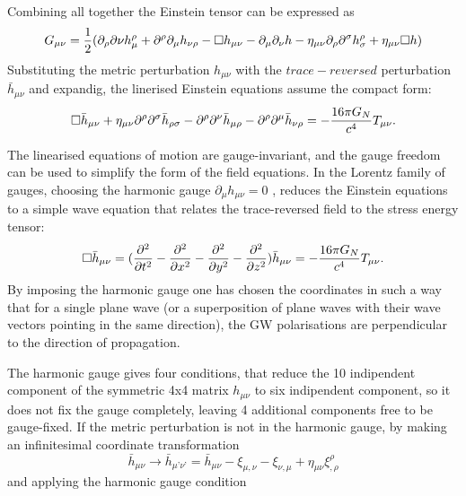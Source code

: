 \documentclass[binding=0.6cm, LaM]{sapthesis}
\begin{document}
Combining all together the Einstein tensor can be expressed as
\begin{equation}
G_{\mu\nu} = {1 \over 2}(\partial_{\rho}\partial{\nu}h^{\rho}_{\mu} + \partial^{\rho}\partial_{\mu}h_{\nu\rho} - \square h_{\mu\nu} - \partial_{\mu}\partial_{\nu}h - \eta_{\mu\nu}\partial_{\rho}\partial^{\sigma}h^{\rho}_{\sigma} + \eta_{\mu\nu}\square h)
\end{equation}
Substituting the metric perturbation $h_{\mu\nu}$  with the $trace-reversed$ perturbation ${\bar h}_{\mu\nu}$ and expandig, the linerised Einstein equations assume the  compact form:
\begin{equation}
\square {\bar h}_{\mu\nu} + \eta_{\mu\nu}{\partial}^{\rho}{\partial}^{\sigma}{\bar h}_{\rho\sigma} - {\partial}^{\rho}{\partial}^{\nu}{\bar h}_{\mu\rho} - {\partial}^{\rho}{\partial}^{\mu}{\bar h}_{\nu\rho} = - {{16\pi G_{N}} \over {c^4}}T_{\mu\nu}.
\end{equation}


The linearised equations of motion are gauge-invariant, and the gauge freedom can
 be used to simplify the form of the field equations.
 In the Lorentz family of gauges, choosing the harmonic gauge 
 $ \partial_{\mu}h_{\mu\nu} = 0 $ 
 , reduces the Einstein equations to a simple wave equation that relates the trace-reversed field
 to the stress energy tensor:
\begin{equation}
\square {\bar h}_{\mu\nu} =({\partial^2 \over {\partial t^2} } - {\partial^2 \over {\partial x^2}}  - {\partial^2 \over {\partial y^2}}  -  {\partial^2 \over {\partial z^2}}) {\bar h}_{\mu\nu} = -{{16\pi G_{N}} \over {c^4}}T_{\mu\nu}. 
\end{equation}
By imposing the harmonic gauge one has chosen the coordinates in such a way that for a single plane wave (or a superposition of plane waves with their wave vectors pointing in the same direction), the GW polarisations are perpendicular to the direction of propagation.

The harmonic gauge gives four conditions, that reduce the 10 indipendent component of the symmetric 4x4 matrix $h_{\mu\nu}$ to six indipendent component, so it does not fix the gauge completely, leaving 4 additional components free to be gauge-fixed.  
If the metric perturbation is not in the harmonic gauge, by making an infinitesimal coordinate transformation 
\begin{equation}
{\bar h}_{\mu\nu} \rightarrow {\bar h}_{\mu’\nu’}  = {\bar h}_{\mu\nu}  - \xi_{\mu,\nu} -\xi_{\nu,\mu} + \eta_{\mu\nu}\xi^{\rho}_{,\rho}
\end{equation}
and applying the harmonic gauge condition
\end{document}
